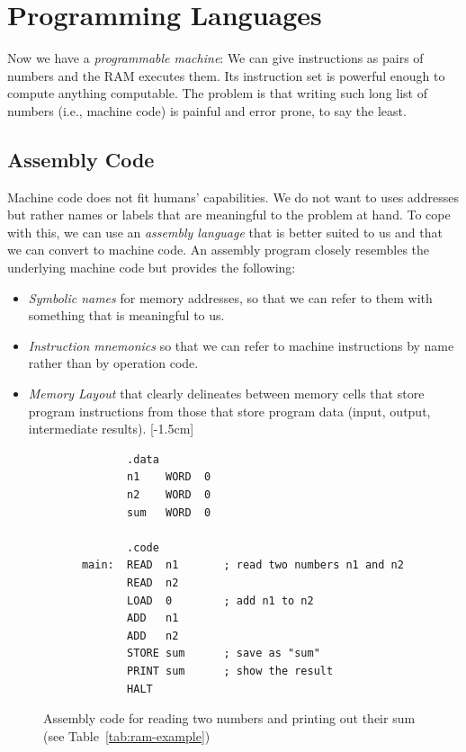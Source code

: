 \documentclass {aldast}
\begin{document}
\section{Programming Languages}

Now we have a \emph{programmable machine}: We can give instructions as
pairs of numbers and the RAM executes them. Its instruction set is powerful
enough to compute anything computable. The problem is that writing
such long list of numbers (i.e., machine code) is painful and error
prone, to say the least.

\subsection{Assembly Code}

Machine code does not fit humans' capabilities. We do not want to uses
addresses but rather names or labels that are meaningful to the
problem at hand. To cope with this, we can use an \emph{assembly
  language} that is better suited to us and that we can convert to
machine code. An assembly program closely resembles the underlying
machine code but provides the following:
\begin{itemize}
\item \emph{Symbolic names} for memory addresses, so that we can refer
  to them with something that is meaningful to us.
\item \emph{Instruction mnemonics} so that we can refer to machine
  instructions by name rather than by operation code.
\item \emph {Memory Layout} that clearly delineates between memory
  cells that store program instructions from those that store program
  data (input, output, intermediate results).  [-1.5cm]
\end{itemize}

\begin{figure}[htbp]
  \begin{center}
    \begin{verbatim}
             .data
             n1    WORD  0   
             n2    WORD  0
             sum   WORD  0
      
             .code
      main:  READ  n1       ; read two numbers n1 and n2
             READ  n2
             LOAD  0        ; add n1 to n2
             ADD   n1
             ADD   n2      
             STORE sum      ; save as "sum"
             PRINT sum      ; show the result
             HALT
    \end{verbatim}
  \end{center}
  \caption{Assembly code for reading two numbers and printing out
    their sum (see Table~\ref{tab:ram-example})}
  \label{fig:asm}
\end{figure}
\end{document}

